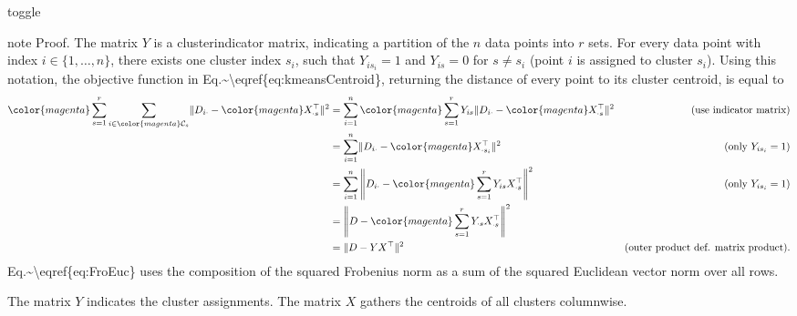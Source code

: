 \documentclass[letterpaper,10pt,english]{jupyterBook}
\begin{document}
\begin{sphinxuseclass}{toggle}
\begin{sphinxadmonition}{note}
\sphinxAtStartPar
Proof. The matrix \(Y\) is a cluster\sphinxhyphen{}indicator matrix, indicating a partition of the \(n\) data points into \(r\) sets. For every data point with index \(i\in\{1,\ldots,n\}\), there exists one cluster index \(s_i\), such that \(Y_{i s_i}=1\) and \(Y_{i s}=0\) for \(s\neq s_i\) (point \(i\) is assigned to cluster \(s_i\)). Using this notation, the objective function in Eq.\textasciitilde{}\textbackslash{}eqref\{eq:kmeansCentroid\}, returning the distance of every point to its cluster centroid, is equal to
\label{equation:clustering_k_means_mf:b594ab60-2688-4f4c-ab0b-6eedc02d978c}\begin{align}
    {\color{magenta}\sum_{s=1}^r}\sum_{i\in{\color{magenta}\mathcal{C}_s}}\lVert D_{i\cdot}-{\color{magenta}X_{\cdot s}^\top}\rVert^2 
    &= \sum_{i=1}^n{\color{magenta}\sum_{s=1}^r Y_{is}} \lVert D_{i\cdot}-{\color{magenta}X_{\cdot s}^\top}\rVert^2 &\text{(use indicator matrix)}\nonumber\\
    &= \sum_{i=1}^n \lVert D_{i\cdot}-{\color{magenta}X_{\cdot {s_i}}^\top}\rVert^2&\text{(only $Y_{i s_i}=1$)}\nonumber\\ 
    &= \sum_{i=1}^n \left\lVert D_{i\cdot}-{\color{magenta}\sum_{s=1}^rY_{is}X_{\cdot s}^\top}\right\rVert^2&\text{(only $Y_{i s_i}=1$)}\nonumber\\
    &= \left\lVert D-{\color{magenta}\sum_{s=1}^rY_{\cdot s}X_{\cdot s}^\top}\right\rVert^2\label{eq:FroEuc}\\
    &= \lVert D-YX^\top\rVert^2 &\text{(outer product def. matrix product)}\nonumber.
\end{align}
\sphinxAtStartPar
Eq.\textasciitilde{}\textbackslash{}eqref\{eq:FroEuc\} uses the composition of the squared Frobenius norm as a sum of the squared Euclidean vector norm over all rows.
\end{sphinxadmonition}

\end{sphinxuseclass}
\sphinxAtStartPar
The matrix \(Y\) indicates the cluster assignments.
The matrix \(X\) gathers the centroids of all clusters column\sphinxhyphen{}wise.
\end{document}
